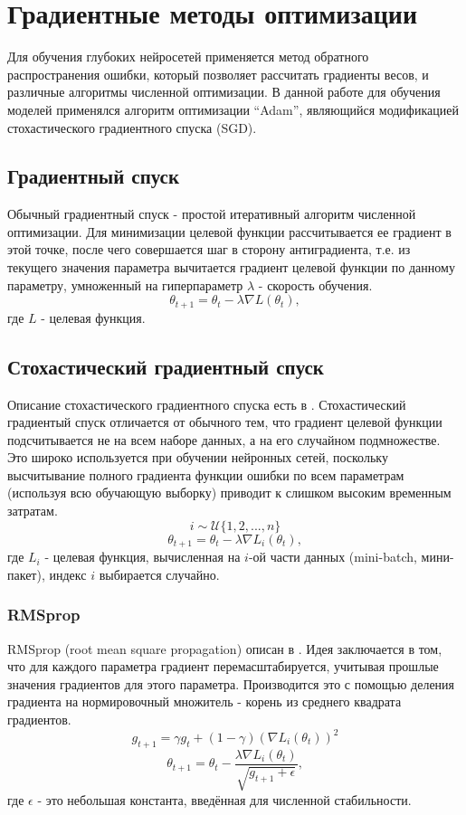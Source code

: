 \clearpage
\section{Градиентные методы оптимизации}
	Для обучения глубоких нейросетей применяется метод обратного распространения ошибки, который позволяет рассчитать градиенты весов, и различные алгоритмы численной оптимизации. В данной работе для обучения моделей применялся алгоритм оптимизации ``Adam'', являющийся модификацией стохастического градиентного спуска (SGD).
	\subsection{Градиентный спуск}
		Обычный градиентный спуск - простой итеративный алгоритм численной оптимизации. Для минимизации целевой функции рассчитывается ее градиент в этой точке, после чего совершается шаг в сторону антиградиента, т.е. из текущего значения параметра вычитается градиент целевой функции по данному параметру, умноженный на гиперпараметр $\lambda$ - скорость обучения.
		$$ \theta_{t+1} = \theta_t - \lambda \nabla L(\theta_t), $$
		где $L$ - целевая функция.
	\subsection{Стохастический градиентный спуск}
		Описание стохастического градиентного спуска есть в \cite{Amari}. Стохастический градиентый спуск отличается от обычного тем, что градиент целевой функции подсчитывается не на всем наборе данных, а на его случайном подмножестве. Это широко используется при обучении нейронных сетей, поскольку высчитывание полного градиента функции ошибки по всем параметрам (используя всю обучающую выборку) приводит к слишком высоким временным затратам.
		$$ i \sim \mathcal{U}\{1, 2, ..., n\} $$
		$$ \theta_{t+1} = \theta_t - \lambda \nabla L_i(\theta_t), $$
		где $L_i$ - целевая функция, вычисленная на $i$-ой части данных (mini-batch, мини-пакет), индекс $i$ выбирается случайно.
		\subsubsection{RMSprop}
			RMSprop (root mean square propagation) описан в \cite{Hinton}. Идея заключается в том, что для каждого параметра градиент перемасштабируется, учитывая прошлые значения градиентов для этого параметра. Производится это с помощью деления градиента на нормировочный множитель - корень из среднего квадрата градиентов.
			$$ g_{t+1} = \gamma g_t + (1 - \gamma) (\nabla L_i(\theta_t))^2$$
			$$ \theta_{t+1} = \theta_t - \frac{\lambda \nabla L_i(\theta_t)}{\sqrt{g_{t+1} + \epsilon}}, $$
			где $\epsilon$ - это небольшая константа, введённая для численной стабильности.
